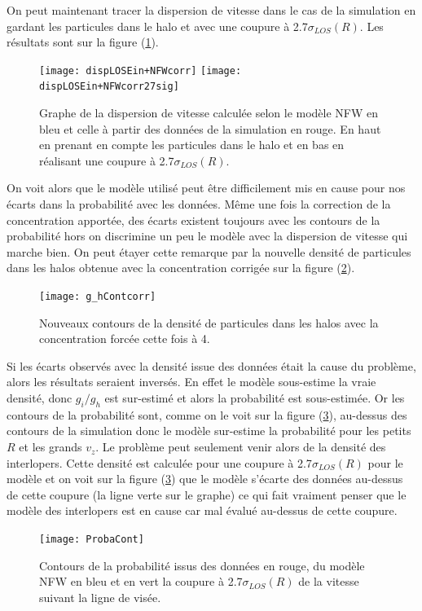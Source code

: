On peut maintenant tracer la dispersion de vitesse dans le cas de la simulation en gardant les particules dans le halo et avec une
coupure à \num{2.7}$\sigma_{LOS}{(R)}$. Les résultats sont sur la figure (\ref{fig:dispvitNFWcorr+27sig}).
\begin{figure}[htb]
	\centering
	\texttt{[image: dispLOSEin+NFWcorr]}
	\texttt{[image: dispLOSEin+NFWcorr27sig]}
	\caption{\footnotesize{}Graphe de la dispersion de vitesse calculée selon le modèle NFW en bleu et celle à partir des
	données de la simulation en rouge. En haut en prenant en compte les particules dans le halo et en bas en réalisant une
	coupure à \num{2.7}$\sigma_{LOS}{(R)}$.}
	\label{fig:dispvitNFWcorr+27sig}
\end{figure}
On voit alors que le modèle utilisé peut être difficilement mis en cause pour nos écarts dans la probabilité avec les données. Même
une fois la correction de la concentration apportée, des écarts existent toujours avec les contours de la probabilité hors on
discrimine un peu le modèle avec la dispersion de vitesse qui marche bien. On peut étayer cette remarque par la nouvelle densité de
particules dans les halos obtenue avec la concentration corrigée sur la figure (\ref{fig:ghcontcorr}).
\begin{figure}[htb]
	\centering
	\texttt{[image: g\_hContcorr]}
	\caption{\footnotesize{}Nouveaux contours de la densité de particules dans les halos avec la concentration forcée cette
	fois à \num{4}.}
	\label{fig:ghcontcorr}
\end{figure}
Si les écarts observés avec la densité issue des données était la cause du problème, alors les résultats seraient inversés. En
effet le modèle sous-estime la vraie densité, donc $g_i/g_h$ est sur-estimé et alors la probabilité est sous-estimée. Or les
contours de la probabilité sont, comme on le voit sur la figure (\ref{fig:probcont}), au-dessus des contours de la simulation donc
le modèle sur-estime la probabilité pour les petits $R$ et les grands $v_z$. Le problème peut seulement venir alors de la densité des interlopers.
Cette densité est calculée pour une coupure à \num{2.7}$\sigma_{LOS}{(R)}$ pour le modèle et on voit sur la figure (\ref{fig:probcont})
que le modèle s'écarte des données au-dessus de cette coupure (la ligne verte sur le graphe) ce qui fait vraiment penser que le modèle
des interlopers est en cause car mal évalué au-dessus de cette coupure.
\begin{figure}[htb]
	\centering
	\texttt{[image: ProbaCont]}
	\caption{\footnotesize{}Contours de la probabilité issus des données en rouge, du modèle NFW en bleu et en vert la coupure
	à \num{2.7}$\sigma_{LOS}{(R)}$ de la vitesse suivant la ligne de visée.}
	\label{fig:probcont}
\end{figure}

